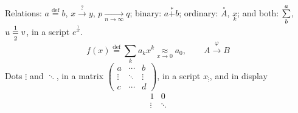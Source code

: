 \documentclass{article}
\begin{document}
Relations: $a \overset{\text{def}}{=} b$, $x \overset{?}{\longrightarrow} y$,
$p \underset{n\to\infty}{\longrightarrow} q$; binary: $a \overset{*}{+} b$;
ordinary: $\overset{\circ}{A}$, $\underset{k}{x}$; and both:
$\overunderset{a}{b}{\sum}$, $u \overunderset{1}{2}{=} v$, in a script $e^{\overset{1}{x}}$.
\[
f(x) \overset{\mathrm{def}}{=} \sum_{k} a_k x^k \underset{x \to 0}{\approx} a_0,
\qquad A \overset{\varphi}{\longrightarrow} B
\]
Dots $\vdots$ and $\ddots$, in a matrix
$\begin{pmatrix} a & \cdots & b \\ \vdots & \ddots & \vdots \\ c & \cdots & d \end{pmatrix}$,
in a script $x_{\vdots}$, and in display
\[
\begin{matrix} 1 & 0 \\ \vdots & \ddots \end{matrix}
\]
\end{document}
